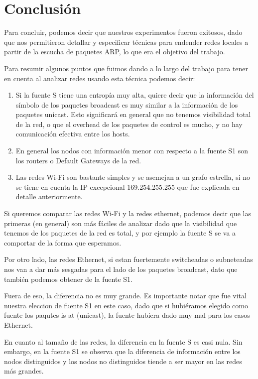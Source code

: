 \section{Conclusión}

Para concluir, podemos decir que nuestros experimentos fueron exitosos, dado que nos permitieron detallar y especificar técnicas para endender redes locales a partir de la escucha de paquetes ARP, lo que era el objetivo del trabajo.

Para resumir algunos puntos que fuimos dando a lo largo del trabajo para tener en cuenta al analizar redes usando esta técnica podemos decir:

\begin{enumerate}
  \item Si la fuente S tiene una entropía muy alta, quiere decir que la información del símbolo de los paquetes broadcast es muy similar a la información de los paquetes unicast. Esto significará en general que no tenemos visibilidad total de la red, o que el overhead de los paquetes de control es mucho, y no hay comunicación efectiva entre los hosts.
  \item En general los nodos con información menor con respecto a la fuente S1 son los routers o Default Gateways de la red.
  \item Las redes Wi-Fi son bastante simples y se asemejan a un grafo estrella, si no se tiene en cuenta la IP excepcional 169.254.255.255 que fue explicada en detalle anteriormente.
\end{enumerate}

Si queremos comparar las redes Wi-Fi y la redes ethernet, podemos decir que las primeras (en general) son más fáciles de analizar dado que la visibilidad que tenemos de los paquetes de la red es total, y por ejemplo la fuente S se va a comportar de la forma que esperamos.

Por otro lado, las redes Ethernet, si estan fuertemente switcheadas o subneteadas nos van a dar más sesgadas para el lado de los paquetes broadcast, dato que también podemos obtener de la fuente S1.

Fuera de eso, la diferencia no es muy grande. Es importante notar que fue vital nuestra eleccion de fuente S1 en este caso, dado que si hubiéramos elegido como fuente los paqutes is-at (unicast), la fuente hubiera dado muy mal para los casos Ethernet.


En cuanto al tamaño de las redes, la diferencia en la fuente S es casi nula. Sin embargo, en la fuente S1 se observa que la diferencia de información entre los nodos distinguidos y los nodos no distinguidos tiende a ser mayor en las redes más grandes.

